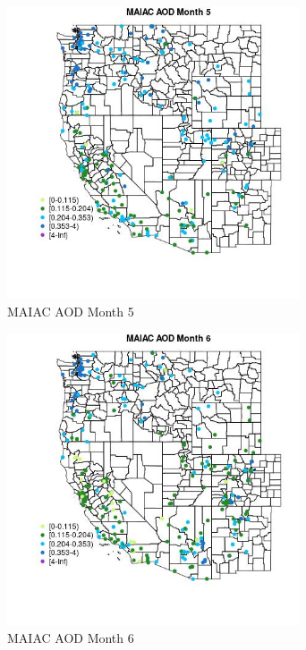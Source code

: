 \begin{figure} 
\centering  
\includegraphics[width=0.77\textwidth]{Code_Outputs/Report_ML_input_PM25_Step4_part_e_de_duplicated_aveswNAs_MapObsMo5MAIAC_AOD.jpg} 
\caption{\label{fig:Report_ML_input_PM25_Step4_part_e_de_duplicated_aveswNAsMapObsMo5MAIAC_AOD}MAIAC AOD Month 5} 
\end{figure} 
 

\clearpage 

\begin{figure} 
\centering  
\includegraphics[width=0.77\textwidth]{Code_Outputs/Report_ML_input_PM25_Step4_part_e_de_duplicated_aveswNAs_MapObsMo6MAIAC_AOD.jpg} 
\caption{\label{fig:Report_ML_input_PM25_Step4_part_e_de_duplicated_aveswNAsMapObsMo6MAIAC_AOD}MAIAC AOD Month 6} 
\end{figure} 
 

